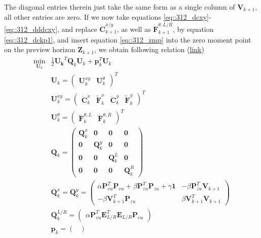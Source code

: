 The diagonal entries therein just take the same form as a single column of $\bm{V}_{k+1}$, all other entries are zero. If we now take equations \ref{eq::312_dcxy}-\ref{eq::312_dddcxy}, and replace $\dot{\bm{C}}_{k+1}^{x/y}$, as well as $\dot{\bm{F}}_{k+1}^{\theta,L/R}$, by equation \ref{eq::312_dckp1}, and insert equation \ref{eq::312_zmp} into the zero moment point on the preview horizon $\bm{Z}_{k+1}$, we obtain following relation (\href{https://github.com/mhubii/nmpc_pattern_generator/blob/5a213044c927dc6aac9f7e32ce1e5fb472cd67bb/libs/pattern_generator/src/nmpc_generator.cpp#L145}{\underline{link}})
\begin{align}
	\min_{\bm{U}_k} &\frac{1}{2}\bm{U_k}^T\bm{Q}_k\bm{U}_k + \bm{p}_k^T\bm{U}_k
	\label{eq::312_canqp} \\
	& \bm{U}_k = \begin{pmatrix}
	\bm{U}^{xy}_k & \bm{U}^\theta_k
	\end{pmatrix}^T\\	
	&\bm{U}^{xy}_k = \begin{pmatrix}
	\dddot{\bm{C}}^x_k & \tilde{\bm{F}}_k^x & \dddot{\bm{C}}_k^y & \tilde{\bm{F}}_k^y
	\end{pmatrix}^T\\
	&\bm{U}^\theta_k = \begin{pmatrix} \dddot{\bm{F}}_k^{\theta, L} & \dddot{\bm{F}}_k^{\theta, R} 
	\end{pmatrix}^T \\
	&\bm{Q}_k = \begin{pmatrix}
	\bm{Q}_k^{x} & \bm{0} & \bm{0} & \bm{0} \\
	\bm{0} & \bm{Q}_k^{y} & \bm{0} & \bm{0} \\
	\bm{0} & \bm{0} & \bm{Q}_k^L & \bm{0} \\ 
	\bm{0} & \bm{0} & \bm{0} & \bm{Q}_k^R
	\end{pmatrix}\\
	& \bm{Q}_k^x = \bm{Q}_k^y = \begin{pmatrix}
		\alpha\bm{P}_{vu}^T\bm{P}_{vu}+\beta\bm{P}_{zu}^T\bm{P}_{zu}+\gamma\bm{1} & -\beta\bm{P}_{zu}^T\bm{V}_{k+1} \\
		-\beta\bm{V}_{k+1}^T\bm{P}_{zu} & \beta\bm{V}_{k+1}^T\bm{V}_{k+1}
	\end{pmatrix}\\
	& \bm{Q}_k^{L/R} = \begin{pmatrix}
		\alpha\bm{P}_{vu}^T\bm{E}_{L/R}^T\bm{E}_{L/R}\bm{P}_{vu}
	\end{pmatrix}\\
	&\bm{p}_k = \begin{pmatrix}

\end{pmatrix}
\end{align}
